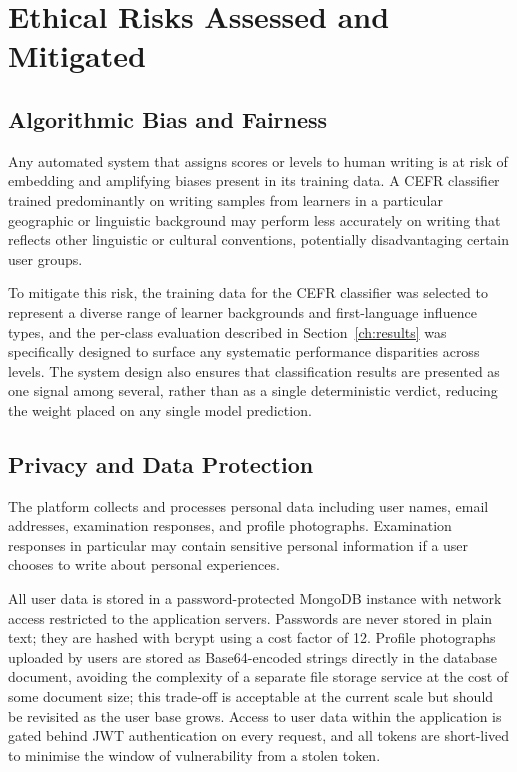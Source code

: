 \documentclass[12pt, a4paper]{report}
\begin{document}
\section{Ethical Risks Assessed and Mitigated}

\subsection{Algorithmic Bias and Fairness}

Any automated system that assigns scores or levels to human writing is at risk of embedding and amplifying biases present in its training data. A CEFR classifier trained predominantly on writing samples from learners in a particular geographic or linguistic background may perform less accurately on writing that reflects other linguistic or cultural conventions, potentially disadvantaging certain user groups.

To mitigate this risk, the training data for the CEFR classifier was selected to represent a diverse range of learner backgrounds and first-language influence types, and the per-class evaluation described in Section~\ref{ch:results} was specifically designed to surface any systematic performance disparities across levels. The system design also ensures that classification results are presented as one signal among several, rather than as a single deterministic verdict, reducing the weight placed on any single model prediction.

\subsection{Privacy and Data Protection}

The platform collects and processes personal data including user names, email addresses, examination responses, and profile photographs. Examination responses in particular may contain sensitive personal information if a user chooses to write about personal experiences.

All user data is stored in a password-protected MongoDB instance with network access restricted to the application servers. Passwords are never stored in plain text; they are hashed with bcrypt using a cost factor of 12. Profile photographs uploaded by users are stored as Base64-encoded strings directly in the database document, avoiding the complexity of a separate file storage service at the cost of some document size; this trade-off is acceptable at the current scale but should be revisited as the user base grows. Access to user data within the application is gated behind JWT authentication on every request, and all tokens are short-lived to minimise the window of vulnerability from a stolen token.
\end{document}
